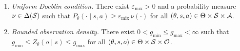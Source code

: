 
\begin{aspt}\label{aspt:particle_error} \text{ }
\begin{enumerate}
\item \emph{Uniform Doeblin condition.} There exist $\varepsilon_{\mathrm{mix}}>0$ and a probability measure $\nu\in\Delta({\mathcal{S}})$ such that $P_\theta(\cdot\mid s,a)\ge \varepsilon_{\mathrm{mix}}\,\nu(\cdot)$ for all $(\theta,s,a)\in\Theta\times{\mathcal{S}}\times{\mathcal{A}}$.
\item \emph{Bounded observation density.} There exist $0<g_{\min}\le g_{\max}<\infty$ such that $g_{\min}\le Z_\theta(o\mid s)\le g_{\max}$ for all $(\theta,s,o)\in\Theta\times{\mathcal{S}}\times{\mathcal{O}}$.
\end{enumerate}
\end{aspt}






